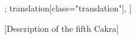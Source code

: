 \documentclass[12pt]{article}%
\begin{document}
\clearpage
\begin{alignment}[
    texts=edition[class="edition"];
    translation[class="translation"],
  ]
\begin{edition}
  \bigskip
    \centerline{\textrm{\small{[Description of the fifth Cakra]}}}
    \bigskip  
    \begin{prose}
      

\end{prose}
\end{edition}
\end{alignment}
\end{document}
